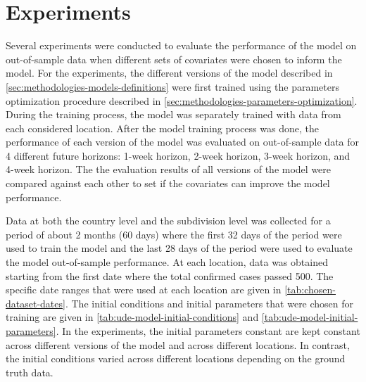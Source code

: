 \section{Experiments}
\label{sec:methodologies-experiments}

Several experiments were conducted to evaluate the performance of the model on out-of-sample data when different sets of covariates were chosen to inform the model.
For the experiments, the different versions of the model described in \autoref{sec:methodologies-models-definitions} were first trained using the parameters optimization procedure described in \autoref{sec:methodologies-parameters-optimization}.
During the training process, the model was separately trained with data from each considered location.
After the model training process was done, the performance of each version of the model was evaluated on out-of-sample data for 4 different future horizons: 1-week horizon, 2-week horizon, 3-week horizon, and 4-week horizon.
The the evaluation results of all versions of the model were compared against each other to set if the covariates can improve the model performance.

Data at both the country level and the subdivision level was collected for a period of about 2 months (60 days) where the first 32 days of the period were used to train the model and the last 28 days of the period were used to evaluate the model out-of-sample performance.
At each location, data was obtained starting from the first date where the total confirmed cases passed 500.
The specific date ranges that were used at each location are given in \autoref{tab:chosen-dataset-dates}.
The initial conditions and initial parameters that were chosen for training are given in \autoref{tab:ude-model-initial-conditions} and \autoref{tab:ude-model-initial-parameters}.
In the experiments, the initial parameters constant are kept constant across different versions of the model and across different locations.
In contrast, the initial conditions varied across different locations depending on the ground truth data.

